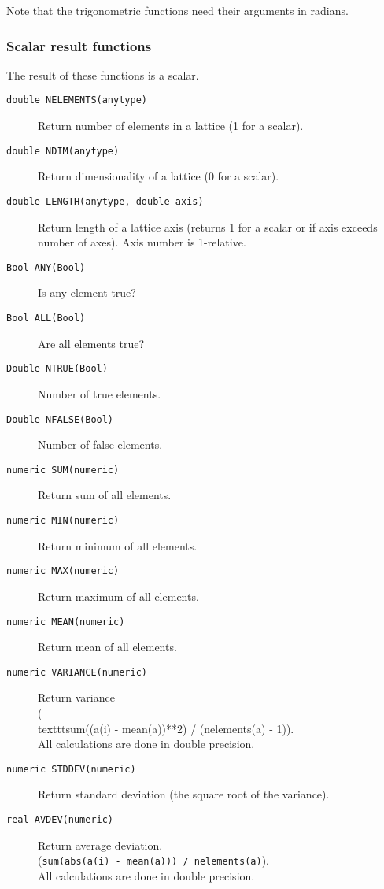 Note that the trigonometric functions need their arguments in radians.

\subsubsection{Scalar result functions}
The result of these functions is a scalar.
\begin{description}
  \item[ \texttt{double NELEMENTS(anytype)}]
    Return number of elements in a lattice (1 for a scalar).
  \item[ \texttt{double NDIM(anytype)}]
    Return dimensionality of a lattice (0 for a scalar).
  \item[ \texttt{double LENGTH(anytype, double axis)}]
    Return length of a lattice axis (returns 1 for a scalar or if axis
    exceeds number of axes). Axis number is 1-relative.
  \item[ \texttt{Bool ANY(Bool)}] Is any element true?
  \item[ \texttt{Bool ALL(Bool)}] Are all elements true?
  \item[ \texttt{Double NTRUE(Bool)}] Number of true elements.
  \item[ \texttt{Double NFALSE(Bool)}] Number of false elements.
  \item[ \texttt{numeric SUM(numeric)}] Return sum of all elements.
  \item[ \texttt{numeric MIN(numeric)}] Return minimum
    of all elements.
  \item[ \texttt{numeric MAX(numeric)}] Return maximum
    of all elements.
  \item[ \texttt{numeric MEAN(numeric)}]
    Return mean of all elements.
  \item[ \texttt{numeric VARIANCE(numeric)}]
    Return variance
    \\(\\texttt{sum((a(i) - mean(a))**2) / (nelements(a) - 1)}).
    \\All calculations are done in double precision.
  \item[ \texttt{numeric STDDEV(numeric)}]
    Return standard deviation (the square root of the variance).
  \item[ \texttt{real AVDEV(numeric)}]
    Return average deviation.
    \\(\texttt{sum(abs(a(i) - mean(a))) / nelements(a)}).
    \\All calculations are done in double precision.
\end{description}

